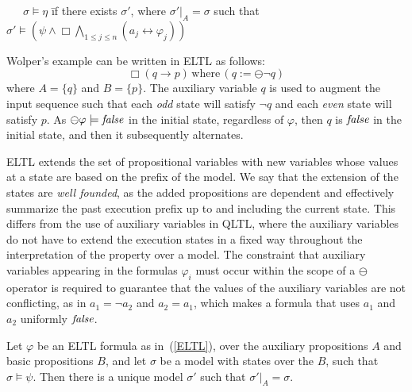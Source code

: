 \begin{tabbing}
\ \ \ $\sigma \models \eta$ \=  if there exists $\sigma'$, where
$\sigma' |_A = \sigma$ such that \\
 \> $\sigma' \models ( \psi  \wedge   \Box \bigwedge_{1 \leq j \leq n} ( a_j \leftrightarrow \varphi_j)) $
\end{tabbing}

\noindent
Wolper's example can be written in ELTL
as follows:
\begin{equation} 
\label{form3}
\Box ( q \rightarrow p ) \, \mathrm{where} \, 
 ( q := \ominus \neg q)
\end{equation}
where $A = \{ q\}$ and $B = \{ p \}$.
The auxiliary variable $q$ is used to augment the input sequence such that each {\em odd} state will satisfy $\neg q$
and each {\em even} state will satisfy $p$.  As $\ominus \varphi \models \mathit{false}$ in the initial state, regardless of $\varphi$, then
$q$ is $\mathit{false}$ in the initial state, and then it subsequently alternates.


ELTL extends the set of propositional variables with new variables whose values at a state are
based on the prefix of the model. We say that
the extension of the states are {\em well founded},
as the added propositions are dependent and effectively summarize the past execution prefix up to and
including the current state.
This differs from 
the use of auxiliary variables in QLTL, where the auxiliary variables do not have to extend the execution
states in a fixed way throughout the interpretation of 
the property over a model. The constraint that auxiliary variables appearing in the formulas $\varphi_i$ 
must occur within the scope of a $\ominus$ operator
is required to guarantee that the values
of the auxiliary variables are not conflicting, as in
$a_1 = \neg a_2$ and $a_2 = a_1$, which makes a formula
that uses $a_1$ and $a_2$ uniformly $\mathit{false}$.

\begin{lemma} \label{fourone}
Let $\varphi$ be an ELTL formula as in~(\ref{ELTL}),
over the auxiliary propositions $A$ and basic propositions $B$, 
and let $\sigma$ be a model with states over the $B$, such that
$\sigma \models \psi$.
Then there is a unique
model $\sigma'$ such that $\sigma' |_A = \sigma$.

\end{lemma}


